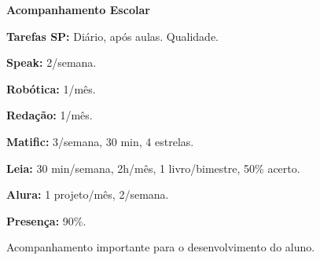 \documentclass[9pt, a4paper]{article} %
\begin{document}
	
	\begin{center}
		\textbf{\Large Acompanhamento Escolar}
		\vspace{-0.3em}
		\hrulefill
		\vspace{-0.3em}
	\end{center}
	
	\noindent \textbf{\textcolor{tarefascor}{Tarefas SP:}} Diário, após aulas. Qualidade.
	
	\noindent \textbf{\textcolor{speakcor}{Speak:}} 2/semana.
	
	\noindent \textbf{\textcolor{roboticacor}{Robótica:}} 1/mês.
	
	\noindent \textbf{\textcolor{redacaocor}{Redação:}} 1/mês.
	
	\noindent \textbf{\textcolor{matificcor}{Matific:}} 3/semana, 30 min, 4 estrelas.
	
	\noindent \textbf{\textcolor{leiacor}{Leia:}} 30 min/semana, 2h/mês, 1 livro/bimestre, 50\% acerto.
	
	\noindent \textbf{\textcolor{aluracor}{Alura:}} 1 projeto/mês, 2/semana.
	
	\noindent \textbf{\textcolor{presencacor}{Presença:}} 90\%.
	
	\vspace{0.5em}
	Acompanhamento importante para o desenvolvimento do aluno.
	
\end{document}
